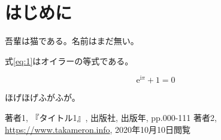 \documentclass[a4j,uplatex]{jsarticle}
\begin{document}
\section{はじめに}

吾輩は猫である。名前はまだ無い。 

式\ref{eq:1}はオイラーの等式である。

\begin{equation}
  \label{eq:1}
  \mathrm{e}^{\mathrm{i}\pi} + 1 = 0
\end{equation}


ほげほげ\cite{refer1}ふがふが\cite{refer2}。

\begin{thebibliography}{9}
   著者1, 『タイトル1』, 出版社, 出版年, pp.000-111
   著者2, \url{https://www.takameron.info}, 2020年10月10日閲覧
\end{thebibliography}
\end{document}
